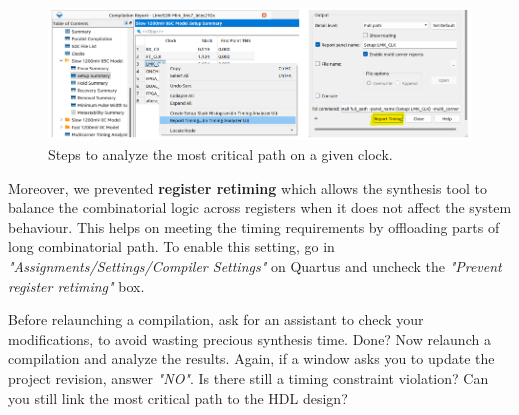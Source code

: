 \begin{figure}[h]
    \centering
    \includegraphics[width=\linewidth]{figures/Report_Timing_Analyzer.png}
    \caption{Steps to analyze the most critical path on a given clock.}
    \label{fig:report_timing_analyzer}
\end{figure}

Moreover, we prevented \textbf{register retiming} which allows the synthesis tool to balance the combinatorial logic across registers when it does not affect the system behaviour. This helps on meeting the timing requirements by offloading parts of long combinatorial path. To enable this setting, go in \textit{"Assignments/Settings/Compiler Settings"} on Quartus and uncheck the \textit{"Prevent register retiming"} box.

Before relaunching a compilation, ask for an assistant to check your modifications, to avoid wasting precious synthesis time. Done? Now relaunch a compilation and analyze the results. Again, if a window asks you to update the project revision, answer \textit{"NO"}. Is there still a timing constraint violation? Can you still link the most critical path to the HDL design?

